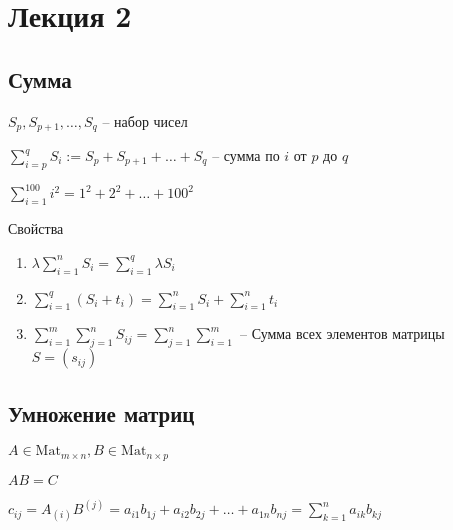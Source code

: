 \section{Лекция 2}

\subsection{Сумма}

$S_p, S_{p + 1}, \dots, S_q$ -- набор чисел

$ \sum_{i = p}^q S_i := S_p + S_{p + 1} + \dots + S_q $ -- сумма по $i$ от $p$ до $q$

$ \sum_{i=1}^100 i^2 = 1^2 + 2^2 + \dots + 100^2 $


Свойства
\begin{enumerate}
    \item $\lambda \sum_{i=1}^n S_i = \sum_{i=1}^q \lambda S_i $
    \item $\sum_{i=1}^q (S_i + t_i) = \sum_{i=1}^n S_i + \sum^n_{i=1} t_i $
    \item $\sum_{i=1}^m \sum_{j=1}^n S_{ij} = \sum_{j=1}^n \sum_{i=1}^m $ -- Сумма всех элементов матрицы $S = (s_{ij})$
\end{enumerate}

\subsection{Умножение матриц}

$A \in \text{Mat}_{m \times n}, B \in \text{Mat}_{n \times p} $

$AB = C$

$c_{ij} = A_{(i)} B^{(j)} = a_{i1} b_{1j} + a_{i2} b_{2j} + \dots + a_{1n} b_{nj} = \sum_{k=1}^n a_{ik} b_{kj} $

